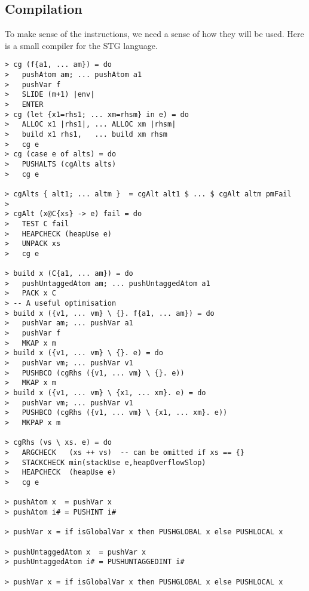 \documentclass[11pt]{article}
\newcommand{\Subsection}[2]{\subsection{#1}\label{sec:#2}}
\begin{document}
\Subsection{Compilation}{hugs-compilation}


\def\is{\mbox{\it is}}
\def\ts{\mbox{\it ts}}
\def\as{\mbox{\it as}}
\def\bs{\mbox{\it bs}}
\def\cs{\mbox{\it cs}}
\def\rs{\mbox{\it rs}}
\def\us{\mbox{\it us}}
\def\vs{\mbox{\it vs}}
\def\ws{\mbox{\it ws}}
\def\xs{\mbox{\it xs}}

\def\e{\mbox{\it e}}
\def\alts{\mbox{\it alts}}
\def\fail{\mbox{\it fail}}
\def\panic{\mbox{\it panic}}
\def\ua{\mbox{\it ua}}
\def\obj{\mbox{\it obj}}
\def\bco{\mbox{\it bco}}
\def\tag{\mbox{\it tag}}
\def\entry{\mbox{\it entry}}
\def\su{\mbox{\it su}}

\def\Ind#1{{\mbox{\it Ind}\ {#1}}}
\def\update#1{{\mbox{\it update}\ {#1}}}

\def\next{$\Longrightarrow$}
\def\append{\mathrel{+\mkern-6mu+}}
\def\reverse{\mbox{\it reverse}}
\def\size#1{{\vert {#1} \vert}}
\def\arity#1{{\mbox{\it arity}{#1}}}

\def\AP{\mbox{\it AP}}
\def\PAP{\mbox{\it PAP}}
\def\GHCRET{\mbox{\it GHCRET}}
\def\GHCOBJ{\mbox{\it GHCOBJ}}

To make sense of the instructions, we need a sense of how they will be
used.  Here is a small compiler for the STG language.

\begin{verbatim}
> cg (f{a1, ... am}) = do
>   pushAtom am; ... pushAtom a1
>   pushVar f
>   SLIDE (m+1) |env|
>   ENTER
> cg (let {x1=rhs1; ... xm=rhsm} in e) = do
>   ALLOC x1 |rhs1|, ... ALLOC xm |rhsm|
>   build x1 rhs1,   ... build xm rhsm
>   cg e
> cg (case e of alts) = do
>   PUSHALTS (cgAlts alts)
>   cg e

> cgAlts { alt1; ... altm }  = cgAlt alt1 $ ... $ cgAlt altm pmFail
>
> cgAlt (x@C{xs} -> e) fail = do
>   TEST C fail
>   HEAPCHECK (heapUse e)
>   UNPACK xs
>   cg e

> build x (C{a1, ... am}) = do 
>   pushUntaggedAtom am; ... pushUntaggedAtom a1
>   PACK x C
> -- A useful optimisation
> build x ({v1, ... vm} \ {}. f{a1, ... am}) = do 
>   pushVar am; ... pushVar a1
>   pushVar f
>   MKAP x m
> build x ({v1, ... vm} \ {}. e) = do 
>   pushVar vm; ... pushVar v1
>   PUSHBCO (cgRhs ({v1, ... vm} \ {}. e))
>   MKAP x m
> build x ({v1, ... vm} \ {x1, ... xm}. e) = do 
>   pushVar vm; ... pushVar v1
>   PUSHBCO (cgRhs ({v1, ... vm} \ {x1, ... xm}. e))
>   MKPAP x m

> cgRhs (vs \ xs. e) = do
>   ARGCHECK   (xs ++ vs)  -- can be omitted if xs == {}
>   STACKCHECK min(stackUse e,heapOverflowSlop)
>   HEAPCHECK  (heapUse e)
>   cg e

> pushAtom x  = pushVar x
> pushAtom i# = PUSHINT i#

> pushVar x = if isGlobalVar x then PUSHGLOBAL x else PUSHLOCAL x 

> pushUntaggedAtom x  = pushVar x
> pushUntaggedAtom i# = PUSHUNTAGGEDINT i#

> pushVar x = if isGlobalVar x then PUSHGLOBAL x else PUSHLOCAL x 
\end{verbatim}
\end{document}
